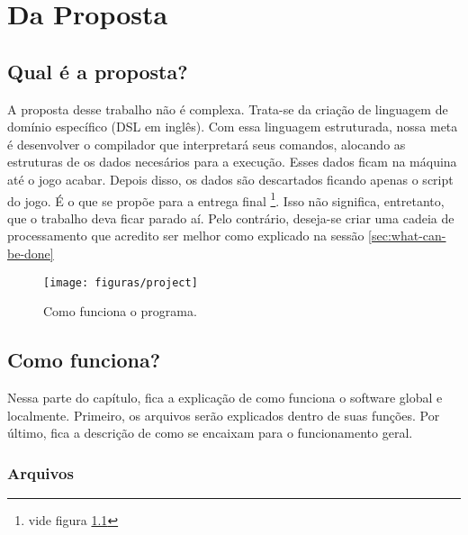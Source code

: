 \chapter{Da Proposta}
\label{cap:propose}

\section{Qual é a proposta?}
\label{sec:what_is}

A proposta desse trabalho não é complexa. Trata-se da criação de linguagem de domínio específico (DSL em inglês).
Com essa linguagem estruturada, nossa meta é desenvolver o compilador que interpretará seus comandos, alocando as estruturas
de os dados necesários para a execução. Esses dados ficam na máquina até o jogo acabar. Depois disso, os dados são descartados ficando
apenas o script do jogo. É o que se propõe para a entrega final \footnote{vide figura \ref{fig:project}}. Isso não significa, entretanto, que o trabalho deva ficar parado aí. Pelo contrário, deseja-se criar uma cadeia de processamento que acredito ser melhor como explicado na sessão \ref{sec:what-can-be-done}

\begin{figure}[htb]
  \centering
  \texttt{[image: figuras/project]}
  \caption{\label{fig:project} Como funciona o programa.}
\end{figure}


\section{Como funciona?}
\label{sec:how-it-works}

Nessa parte do capítulo, fica a explicação de como funciona o software global e localmente. Primeiro, os arquivos serão explicados dentro de suas funções. Por último, fica a descrição de como se encaixam para o funcionamento geral.

\subsection{Arquivos}
\label{subsec:files}

